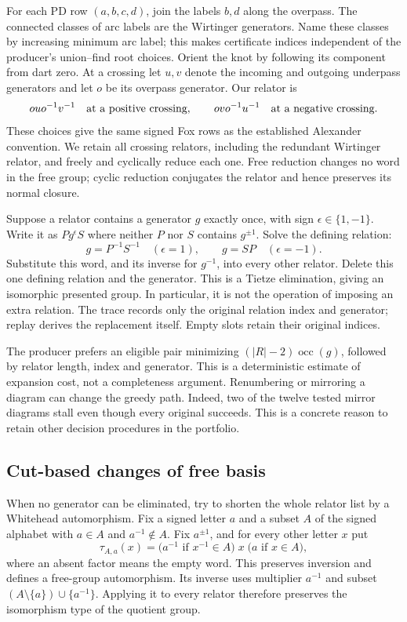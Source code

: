 For each PD row $(a,b,c,d)$, join the labels $b,d$ along the overpass.
The connected classes of arc labels are the Wirtinger generators.  Name
these classes by increasing minimum arc label; this makes certificate
indices independent of the producer's union--find root choices.  Orient
the knot by following its component from dart zero.  At a crossing let
$u,v$ denote the incoming and outgoing underpass generators and let $o$
be its overpass generator.  Our relator is
\[
 o u o^{-1}v^{-1}\quad\hbox{at a positive crossing},\qquad
 o v o^{-1}u^{-1}\quad\hbox{at a negative crossing}.
\]
These choices give the same signed Fox rows as the established Alexander
convention.  We retain all crossing relators, including the redundant
Wirtinger relator, and freely and cyclically reduce each one.  Free
reduction changes no word in the free group; cyclic reduction conjugates
the relator and hence preserves its normal closure.

Suppose a relator contains a generator $g$ exactly once, with sign
$\epsilon\in\{1,-1\}$.  Write it as $P g^{\epsilon} S$ where neither
$P$ nor $S$ contains $g^{\pm1}$.  Solve the defining relation:
\[
 g=P^{-1}S^{-1}\quad(\epsilon=1),\qquad
 g=SP\quad(\epsilon=-1).
\]
Substitute this word, and its inverse for $g^{-1}$, into every other
relator.  Delete this one defining relation and the generator.  This is a
Tietze elimination, giving an isomorphic presented group.  In particular,
it is not the operation of imposing an extra relation.  The trace records
only the original relation index and generator; replay derives the
replacement itself.  Empty slots retain their original indices.

The producer prefers an eligible pair minimizing
$(|R|-2)\operatorname{occ}(g)$, followed by relator length, index and generator.
This is a deterministic estimate of expansion cost, not a completeness
argument.  Renumbering or mirroring a diagram can change the greedy path.
Indeed, two of the twelve tested mirror diagrams stall even though every
original succeeds.  This is a concrete reason to retain other decision
procedures in the portfolio.

\subsection{Cut-based changes of free basis}

When no generator can be eliminated, try to shorten the whole relator
list by a Whitehead automorphism.  Fix a signed letter $a$ and a subset
$A$ of the signed alphabet with $a\in A$ and $a^{-1}\notin A$.  Fix
$a^{\pm1}$, and for every other letter $x$ put
\[
 \tau_{A,a}(x)=
 \bigl(a^{-1}\text{ if }x^{-1}\in A\bigr)\;x\;
 \bigl(a\text{ if }x\in A\bigr),
\]
where an absent factor means the empty word.  This preserves inversion and
defines a free-group automorphism.  Its inverse uses multiplier $a^{-1}$
and subset $(A\setminus\{a\})\cup\{a^{-1}\}$.  Applying it to every
relator therefore preserves the isomorphism type of the quotient group.

